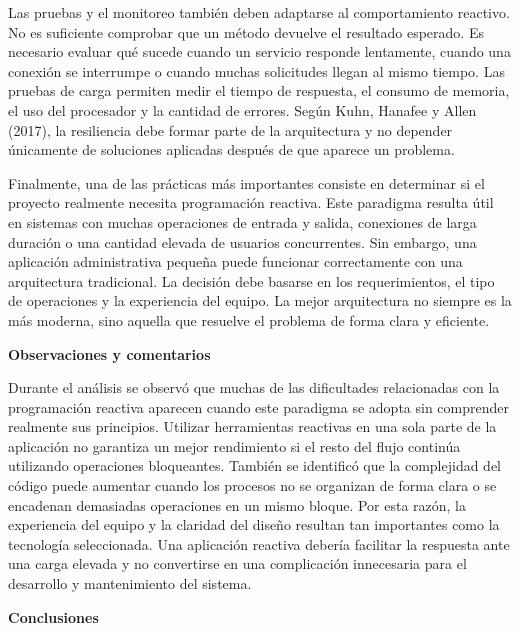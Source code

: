\documentclass[12pt,letterpaper]{article}
\begin{document}
Las pruebas y el monitoreo también deben adaptarse al comportamiento reactivo. No es suficiente comprobar que un método devuelve el resultado esperado. Es necesario evaluar qué sucede cuando un servicio responde lentamente, cuando una conexión se interrumpe o cuando muchas solicitudes llegan al mismo tiempo. Las pruebas de carga permiten medir el tiempo de respuesta, el consumo de memoria, el uso del procesador y la cantidad de errores. Según Kuhn, Hanafee y Allen (2017), la resiliencia debe formar parte de la arquitectura y no depender únicamente de soluciones aplicadas después de que aparece un problema.

Finalmente, una de las prácticas más importantes consiste en determinar si el proyecto realmente necesita programación reactiva. Este paradigma resulta útil en sistemas con muchas operaciones de entrada y salida, conexiones de larga duración o una cantidad elevada de usuarios concurrentes. Sin embargo, una aplicación administrativa pequeña puede funcionar correctamente con una arquitectura tradicional. La decisión debe basarse en los requerimientos, el tipo de operaciones y la experiencia del equipo. La mejor arquitectura no siempre es la más moderna, sino aquella que resuelve el problema de forma clara y eficiente.


\textbf{Observaciones y comentarios}

Durante el análisis se observó que muchas de las dificultades relacionadas con la programación reactiva aparecen cuando este paradigma se adopta sin comprender realmente sus principios. Utilizar herramientas reactivas en una sola parte de la aplicación no garantiza un mejor rendimiento si el resto del flujo continúa utilizando operaciones bloqueantes. También se identificó que la complejidad del código puede aumentar cuando los procesos no se organizan de forma clara o se encadenan demasiadas operaciones en un mismo bloque. Por esta razón, la experiencia del equipo y la claridad del diseño resultan tan importantes como la tecnología seleccionada. Una aplicación reactiva debería facilitar la respuesta ante una carga elevada y no convertirse en una complicación innecesaria para el desarrollo y mantenimiento del sistema.

\textbf{Conclusiones}
\end{document}
